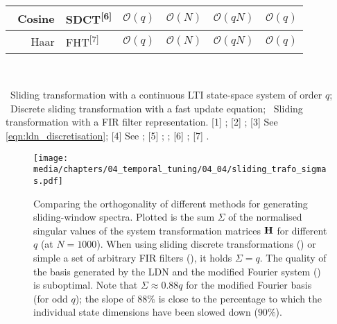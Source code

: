 \begin{table}[p]
{\begin{tabular}{r l c c c c}
		\midrule
		\symSDT~Cosine & SDCT\textsuperscript{[6]} & $\mathcal{O}(q)$ & $\mathcal{O}(N)$ & $\mathcal{O}(qN)$ & $\mathcal{O}(q)$ \\
		\midrule
		\symSDT~Haar & FHT\textsuperscript{[7]} & $\mathcal{O}(q)$ & $\mathcal{O}(N)$ & $\mathcal{O}(qN)$ & $\mathcal{O}(q)$ \\
		\bottomrule
	\end{tabular}\\[1em]
	}
	{\footnotesize
		\symLTI~Sliding transformation with a continuous LTI state-space system of order $q$;
		\symSDT~Discrete sliding transformation with a fast update equation;
		\symFIR~Sliding transformation with a FIR filter representation.
		[1] \cite{cooley1965algorithm};
		[2] \cite{gardner1995efficient};
		[3] See \cref{eqn:ldn_discretisation};
		[4] See ;
		[5] \cite{springer1991sliding}; \cite{jacobsen2003sliding};
		[6] \cite{kober2004fast};
		[7] \cite{kaiser1998fast}.
	}
\end{table}

\begin{figure}[p]
	\centering
	\texttt{[image: media/chapters/04\_temporal\_tuning/04\_04/sliding\_trafo\_sigmas.pdf]}
	\caption[Comparing the orthogonality of different methods for generating sliding-window spectra]{
		Comparing the orthogonality of different methods for generating sliding-window spectra.
		Plotted is the sum $\Sigma$ of the normalised singular values of the system transformation matrices $\mathbf{H}$ for different $q$ (at $N = 1000$).
		When using sliding discrete transformations (\symSDT) or simple a set of arbitrary FIR filters (\symFIR), it holds $\Sigma = q$.
		The quality of the basis generated by the LDN and the modified Fourier system (\symLTI) is suboptimal.
	Note that $\Sigma \approx 0.88q$ for the modified Fourier basis (for odd $q$); the slope of $88\%$ is close to the percentage to which the individual state dimensions have been slowed down ($90\%$).
	}
	\label{fig:sliding_trafo_sigmas}
\end{figure}

